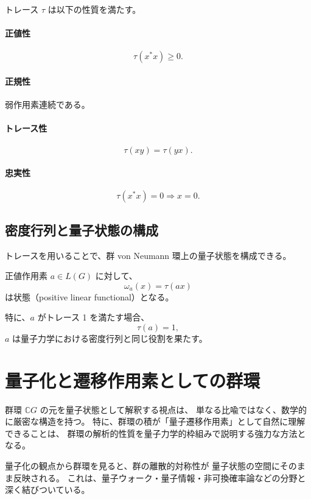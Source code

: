 \documentclass[12pt,a4paper]{ltjarticle}
\theoremstyle{definition}
\begin{document}
トレース $\tau$ は以下の性質を満たす。

\paragraph{正値性}
\[
\tau(x^*x) \ge 0.
\]

\paragraph{正規性}
弱作用素連続である。

\paragraph{トレース性}
\[
\tau(xy) = \tau(yx).
\]

\paragraph{忠実性}
\[
\tau(x^*x) = 0 \Rightarrow x = 0.
\]

\subsection{密度行列と量子状態の構成}

トレースを用いることで、群 von Neumann 環上の量子状態を構成できる。

正値作用素 $a \in L(G)$ に対して、
\[
\omega_a(x) = \tau(ax)
\]
は状態（positive linear functional）となる。

特に、$a$ がトレース 1 を満たす場合、
\[
\tau(a) = 1,
\]
$a$ は量子力学における密度行列と同じ役割を果たす。

\section{量子化と遷移作用素としての群環}

群環 $\mathbb{C}G$ の元を量子状態として解釈する視点は、
単なる比喩ではなく、数学的に厳密な構造を持つ。
特に、群環の積が「量子遷移作用素」として自然に理解できることは、
群環の解析的性質を量子力学的枠組みで説明する強力な方法となる。

量子化の観点から群環を見ると、群の離散的対称性が
量子状態の空間にそのまま反映される。
これは、量子ウォーク・量子情報・非可換確率論などの分野と
深く結びついている。
\end{document}
